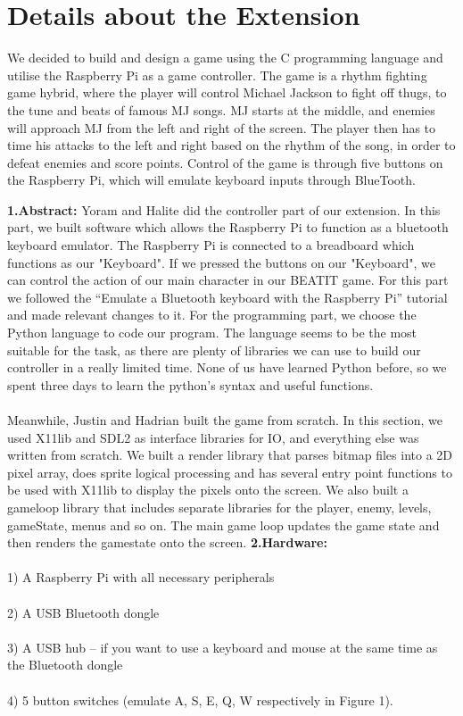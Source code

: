\documentclass[a4paper]{article}
\begin{document}
\section{Details about the Extension}
We decided to build and design a game using the C programming language and utilise the Raspberry Pi as a game controller. The game is a rhythm fighting game hybrid, where the player will control Michael Jackson to fight off thugs, to the tune and beats of famous MJ songs. MJ starts at the middle, and enemies will approach MJ from the left and right of the screen. The player then has to time his attacks to the left and right based on the rhythm of the song, in order to defeat enemies and score points. Control of the game is through five buttons on the Raspberry Pi, which will emulate keyboard inputs through BlueTooth.

\textbf{1.Abstract:}  Yoram and Halite did the controller part of our extension. In this part, we built software which allows the Raspberry Pi to function as a bluetooth keyboard emulator. The Raspberry Pi is connected to a breadboard which functions as our "Keyboard". If we pressed the buttons on our "Keyboard", we can control the action of our main character in our BEATIT game. For this part we followed the “Emulate a Bluetooth keyboard with the Raspberry Pi” tutorial and made relevant changes to it.
For the programming part, we choose the Python language to code our program. The language seems to be the most suitable for the task, as there are plenty of libraries we can use to build our controller in a really limited time. None of us have learned Python before, so we spent three days to learn the python’s syntax and useful functions.\\\\
Meanwhile, Justin and Hadrian built the game from scratch. In this section, we used X11lib and SDL2 as interface libraries for IO, and everything else was written from scratch. We built a render library that parses bitmap files into a 2D pixel array, does sprite logical processing and has several entry point functions to be used with X11lib to display the pixels onto the screen. We also built a gameloop library that includes separate libraries for the player, enemy, levels, gameState, menus and so on. The main game loop updates the game state and then renders the gamestate onto the screen.
\newpage
\textbf{2.Hardware:}\\\\
1) A Raspberry Pi with all necessary peripherals   \\\\
2) A USB Bluetooth dongle \\\\
3) A USB hub – if you want to use a keyboard and mouse at the same time as the Bluetooth dongle  \\\\
4) 5 button switches  (emulate A, S, E, Q, W respectively in Figure 1).  \\\\
\end{document}
